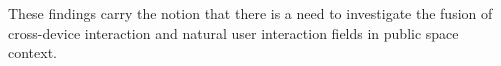  These findings carry the notion that there is a need to investigate the fusion of cross-device interaction and natural user interaction fields in public space context. %

